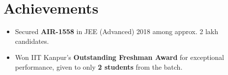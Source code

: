 \documentclass[10pt,a4paper]{article}
\newcommand{\resumeItem}[1]{\item[\textcolor{primary}{\textbullet}] #1}
\begin{document}
\section{Achievements}
\small
\begin{itemize}[leftmargin=1.05em, nosep, topsep=2pt, itemsep=2pt, parsep=0pt]
    \resumeItem{Secured \textbf{AIR-1558} in JEE (Advanced) 2018 among approx. 2 lakh candidates.}
    \resumeItem{Won IIT Kanpur's \textbf{Outstanding Freshman Award} for exceptional performance, given to only \textbf{2 students} from the batch.}
\end{itemize}
\end{document}
